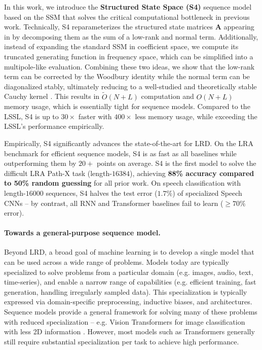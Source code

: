 In this work, we introduce the \textbf{Structured State Space (S4)} sequence model based on the SSM that solves the critical computational bottleneck in previous work. Technically, S4 reparameterizes the structured state matrices \( \bm{A} \) appearing in \citet{voelker2019legendre,gu2020hippo} by decomposing them as the sum of a low-rank and normal term. Additionally, instead of expanding the standard SSM in coefficient space, we compute its truncated generating function in frequency space, which can be simplified into a multipole-like evaluation. Combining these two ideas, we show that the low-rank term can be corrected by the Woodbury identity while the normal term can be diagonalized stably, ultimately reducing to a well-studied and theoretically stable Cauchy kernel \citep{pan2001structured,pan2017fast}. This results in \( \tilde{O}(N+L) \) computation and \( O(N+L) \) memory usage, which is essentially tight for sequence models. Compared to the LSSL, S4 is up to $30\times$ faster with $400\times$ less memory usage, while exceeding the LSSL's performance empirically.

Empirically, S4 significantly advances the state-of-the-art for LRD. On the LRA benchmark for efficient sequence models, S4 is as fast as all baselines while outperforming them by $20+$ points on average. S4 is the first model to solve the difficult LRA Path-X task (length-$16384$), achieving \textbf{88\% accuracy compared to 50\% random guessing} for all prior work. On speech classification with length-$16000$ sequences, S4 halves the test error ($1.7\%$) of specialized Speech CNNs -- by contrast, all RNN and Transformer baselines fail to learn ($\ge 70\%$ error).

\paragraph{Towards a general-purpose sequence model.} Beyond LRD, a broad goal of machine learning is to develop a single model that can be used across a wide range of problems. Models today are typically specialized to solve problems from a particular domain (e.g. images, audio, text, time-series), and enable a narrow range of capabilities (e.g. efficient training, fast generation, handling irregularly sampled data). This specialization is typically expressed via domain-specific preprocessing, inductive biases, and architectures. Sequence models provide a general framework for solving many of these problems with reduced specialization -- e.g. Vision Transformers for image classification with less 2D information \citep{dosovitskiy2020image}. However, most models such as Transformers generally still require substantial specialization per task to achieve high performance.

